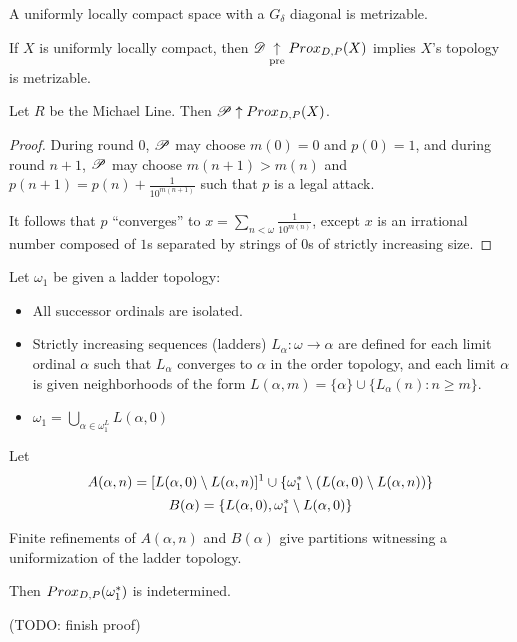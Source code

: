 \begin{thm}
  A uniformly locally compact space with a $G_\delta$ diagonal is metrizable.
\end{thm}

\begin{cor}
  If $X$ is uniformly locally compact, then $\mathscr{D} \underset{\text{pre}}{\uparrow} Prox_{D,P}(X)$
  implies $X$'s topology is metrizable.
\end{cor}

\begin{ex}
  Let $R$ be the Michael Line. Then $\mathscr{P}\uparrow Prox_{D,P}(X)$.
\end{ex}

\begin{proof}
  During round $0$, $\mathscr{P}$ may choose $m(0)=0$ and $p(0)=1$,
  and during round $n+1$,
  $\mathscr{P}$ may choose $m(n+1)>m(n)$ and
  $p(n+1)=p(n)+\frac{1}{10^{m(n+1)}}$ such that $p$ is a legal attack.

  It follows that $p$ ``converges'' to
  $x=\sum_{n<\omega}\frac{1}{10^{m(n)}}$, except $x$ is an irrational
  number composed of $1$s separated by strings of $0$s of strictly
  increasing size.
\end{proof}

\begin{ex}
  Let $\omega_1$ be given a ladder topology:
    \begin{itemize}
      \item All successor ordinals are isolated.
      \item Strictly increasing sequences (ladders) $L_\alpha:\omega\to\alpha$
            are defined for each limit ordinal $\alpha$ such that $L_\alpha$ converges to $\alpha$ in the order topology, and each limit
            $\alpha$ is given neighborhoods of the form
            $L(\alpha,m)=\{\alpha\}\cup\{L_\alpha(n):n\geq m\}$.
      \item $\omega_1=\bigcup_{\alpha\in\omega_1^L} L(\alpha,0)$
    \end{itemize}

  Let
    \[
      A(\alpha,n)
        =
      [L(\alpha,0)\setminus L(\alpha,n)]^1
        \cup
      \{\omega^*_1 \setminus (L(\alpha,0)\setminus L(\alpha,n))\}
    \]
    \[
      B(\alpha)
        =
      \{L(\alpha,0), \omega^*_1 \setminus L(\alpha,0)\}
    \]

  Finite refinements of $A(\alpha,n)$ and $B(\alpha)$ give partitions
  witnessing a uniformization of the ladder topology.

  Then $Prox_{D,P}(\omega^*_1)$ is indetermined.
\end{ex}

(TODO: finish proof)